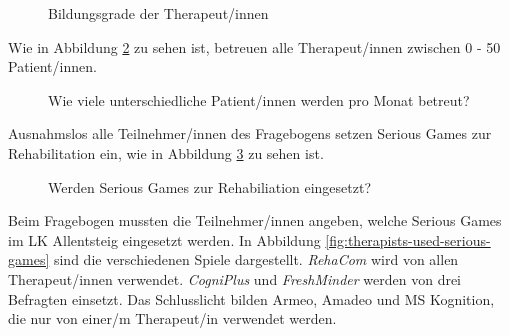 \begin{figure}[H]
    \centering
    \caption{Bildungsgrade der Therapeut/innen}
    \label{fig:therapists-school-type}
\end{figure}

Wie in Abbildung \ref{fig:therapeutic-patient-amount} zu sehen ist, betreuen alle Therapeut/innen zwischen 0 - 50 Patient/innen.

\begin{figure}[H]
    \centering
    \caption{Wie viele unterschiedliche Patient/innen werden pro Monat betreut?}
    \label{fig:therapeutic-patient-amount}
\end{figure}

Ausnahmslos alle Teilnehmer/innen des Fragebogens setzen Serious Games zur Rehabilitation ein, wie in Abbildung \ref{fig:therapeutic-serious-games-used} zu sehen ist.

\begin{figure}[H]
    \centering
    \caption{Werden Serious Games zur Rehabiliation eingesetzt?}
    \label{fig:therapeutic-serious-games-used}
\end{figure}

Beim Fragebogen mussten die Teilnehmer/innen angeben, welche Serious Games im LK Allentsteig eingesetzt werden. In Abbildung \ref{fig:therapists-used-serious-games} sind die verschiedenen Spiele dargestellt.  \textit{RehaCom} wird von allen Therapeut/innen verwendet. \textit{CogniPlus} und \textit{FreshMinder} werden von drei Befragten einsetzt. Das Schlusslicht bilden Armeo, Amadeo und MS Kognition, die nur von einer/m Therapeut/in verwendet werden.

